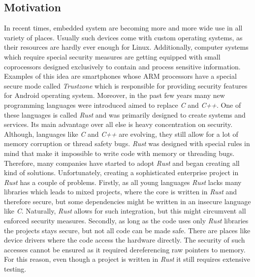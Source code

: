 \subsection{Motivation}
In recent times, embedded system are becoming more and more wide use in all variety of places. Usually such devices come with custom operating systems, as their resources are hardly ever enough for Linux. Additionally, computer systems which require special security measures are getting equipped with small coprocessors designed exclusively to contain and process sensitive information. Examples of this idea are smartphones whose ARM processors have a special secure mode called \textit{Trustzone} which is responsible for providing security features for Android operating system. Moreover, in the past few years many new programming languages were introduced aimed to replace \textit{C} and \textit{C++}. One of these languages is called \textit{Rust} and was primarily designed to create systems and services. Its main advantage over all else is heavy concentration on security. Although, languages like \textit{C} and \textit{C++} are evolving, they still allow for a lot of memory corruption or thread safety bugs. \textit{Rust} was designed with special rules in mind that make it impossible to write code with memory or threading bugs. Therefore, many companies have started to adopt \textit{Rust} and began creating all kind of solutions. Unfortunately, creating a sophisticated enterprise project in \textit{Rust} has a couple of problems. Firstly, as all young languages \textit{Rust} lacks many libraries which leads to mixed projects, where the core is written in \textit{Rust} and therefore secure, but some dependencies might be written in an insecure language like \textit{C}. Naturally, \textit{Rust} allows for such integration, but this might circumvent all enforced security measures. Secondly, as long as the code uses only \textit{Rust} libraries the projects stays secure, but not all code can be made safe. There are places like device drivers where the code access the hardware directly. The security of such accesses cannot be ensured as it required dereferencing raw pointers to memory. For this reason, even though a project is written in \textit{Rust} it still requires extensive testing.

